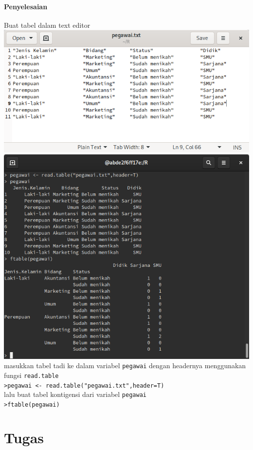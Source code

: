 \documentclass[a4paper,12pt]{article}
\begin{document}
\paragraph{Penyelesaian\\}
Buat tabel dalam text editor\\
\includegraphics[width=\linewidth]{pegawaitxt}
\includegraphics[width=\linewidth]{6}
masukkan tabel tadi ke dalam variabel \texttt{pegawai} dengan headernya menggunakan fungsi \texttt{read.table}\\
\texttt{>pegawai <- read.table("pegawai.txt",header=T)}\\
lalu buat tabel kontigensi dari variabel \texttt{pegawai}\\
\texttt{>ftable(pegawai)}
\newpage
\section{Tugas}
\end{document}
